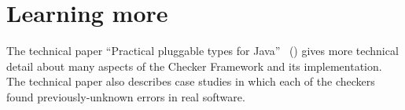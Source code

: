 





% 
% 
% 
% 
% 
% 
% 



\section{Learning more\label{learning-more}}

The technical paper ``Practical pluggable types for Java''~\cite{PapiACPE2008}
()
gives more technical detail about many
aspects of the Checker Framework and its implementation.
%
The technical
paper also describes case
studies in which each of the checkers found
previously-unknown errors in real software.

